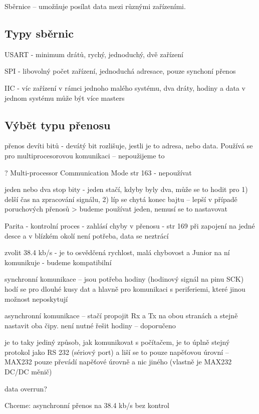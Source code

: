 Sběrnice -- umožňuje posílat data mezi různými zařízeními.   

\subsection{Typy sběrnic}

USART - minimum drátů, rychý, jednoduchý, dvě zařízení 

SPI - libovolný počet zařízení, jednoduchá adresace, pouze synchoní přenos 

IIC - víc zařízení v rámci jednoho malého systému, dva dráty, hodiny a data 
v jednom systému může být více masters 
 
\subsection{Výbět typu přenosu }


přenos devíti bitů - devátý bit rozlišuje, jestli je to adresa, nebo data. 
Používá se pro multiprocesorovou komunikaci -- nepoužijeme to  

? Multi-processor Communication Mode str 163 - nepoužívat 

jeden nebo dva stop bity - jeden stačí, kdyby byly dva, může se to hodit pro 
1) delší čas na zpracování signálu, 
2) líp se chytá konec bajtu -- lepší v případě poruchových přenosů 
> budeme používat jeden, nemusí se to nastavovat 


 Parita - kontrolní proces - zahlásí chyby v přenosu - str 169 při zapojení na jedné desce a v blízkém okolí není potřeba, data se neztrácí 
 
 zvolit 38.4 kb/s - je to osvědčená rychlost, malá chybovost a Junior na ní komunikuje - budeme kompatibilní 
 
 synchronní komunikace -- jsou potřeba hodiny (hodinový signál na pinu SCK) 
 hodí se pro dlouhé kusy dat a hlavně pro komunikaci s periferiemi, které jinou možnost neposkytují 
 
 asynchronní komunikace -- stačí propojit Rx a Tx na obou stranách a stejně nastavit oba čipy. není nutné řešit hodiny --  doporučeno   
 
 je to taky jediný způsob, jak komunikovat s počítačem, je to úplně stejný protokol jako RS 232 (sériový port) a liší se to pouze napěťovou úrovní -- MAX232 pouze převádí napěťové úrovně a nic jiného (vlastně je MAX232 DC/DC měnič)
 
 data overrun? 
 
Chceme: asynchronní přenos na 38.4 kb/s bez kontrol  


